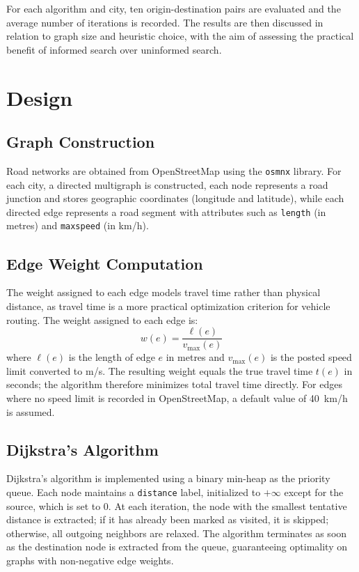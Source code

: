 \documentclass[12pt,a4paper]{article}
\begin{document}
For each algorithm and city, ten origin-destination pairs are evaluated and the average number of iterations is recorded.
The results are then discussed in relation to graph size and heuristic choice, with the aim of assessing the practical benefit of informed search over uninformed search.

\section{Design}

\subsection{Graph Construction}

Road networks are obtained from OpenStreetMap using the \texttt{osmnx} library.
For each city, a directed multigraph is constructed, each node represents a road junction and stores geographic coordinates (longitude and latitude), while each directed edge represents a road segment with attributes such as \texttt{length} (in metres) and \texttt{maxspeed} (in km/h).

\subsection{Edge Weight Computation}

The weight assigned to each edge models travel time rather than physical distance, as travel time is a more practical optimization criterion for vehicle routing.
The weight assigned to each edge is:
\[
  w(e) = \frac{\ell(e)}{v_{\max}(e)}
\]
where $\ell(e)$ is the length of edge $e$ in metres and $v_{\max}(e)$ is the posted speed limit converted to m/s.
The resulting weight equals the true travel time $t(e)$ in seconds; the algorithm therefore minimizes total travel time directly.
For edges where no speed limit is recorded in OpenStreetMap, a default value of 40~km/h is assumed.

\subsection{Dijkstra's Algorithm}

Dijkstra's algorithm is implemented using a binary min-heap as the priority queue.
Each node maintains a \texttt{distance} label, initialized to $+\infty$ except for the source, which is set to 0.
At each iteration, the node with the smallest tentative distance is extracted; if it has already been marked as visited, it is skipped; otherwise, all outgoing neighbors are relaxed.
The algorithm terminates as soon as the destination node is extracted from the queue, guaranteeing optimality on graphs with non-negative edge weights.
\end{document}
